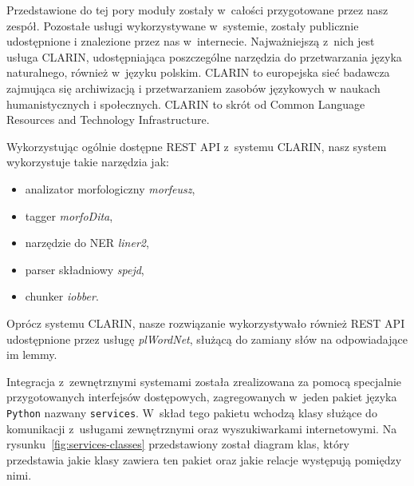 Przedstawione do tej pory moduły zostały w~całości przygotowane przez nasz zespół. Pozostałe usługi wykorzystywane w~systemie, zostały publicznie udostępnione i znalezione przez nas w~internecie. Najważniejszą z~nich jest usługa CLARIN, udostępniająca poszczególne narzędzia do przetwarzania języka naturalnego, również w~języku polskim. CLARIN to europejska sieć badawcza zajmująca się archiwizacją i przetwarzaniem zasobów językowych w naukach humanistycznych i społecznych. CLARIN to skrót od Common Language Resources and Technology Infrastructure.

Wykorzystując ogólnie dostępne REST API z~systemu CLARIN, nasz system wykorzystuje takie narzędzia jak:
\begin{itemize}
    \item analizator morfologiczny \textit{morfeusz},
    \item tagger \textit{morfoDita},
    \item narzędzie do NER \textit{liner2},
    \item parser składniowy \textit{spejd},
    \item chunker \textit{iobber}.
\end{itemize}

Oprócz systemu CLARIN, nasze rozwiązanie wykorzystywało również REST API udostępnione przez usługę \textit{plWordNet}, służącą do zamiany słów na odpowiadające im lemmy.

Integracja z~zewnętrznymi systemami została zrealizowana za pomocą specjalnie przygotowanych interfejsów dostępowych, zagregowanych w~jeden pakiet języka \texttt{Python} nazwany \texttt{services}. W~skład tego pakietu wchodzą klasy służące do komunikacji z~usługami zewnętrznymi oraz wyszukiwarkami internetowymi. Na rysunku~\ref{fig:services-classes} przedstawiony został diagram klas, który przedstawia jakie klasy zawiera ten pakiet oraz jakie relacje występują pomiędzy nimi.

